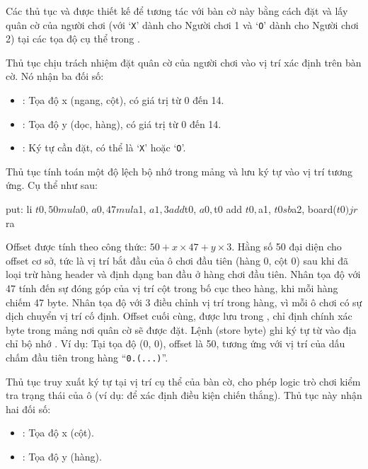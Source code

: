 Các thủ tục  và  được thiết kế để tương tác với bàn cờ này bằng cách đặt và lấy quân cờ của người chơi (với `\texttt{X}' dành cho Người chơi 1 và `\texttt{O}' dành cho Người chơi 2) tại các tọa độ cụ thể trong .

Thủ tục  chịu trách nhiệm đặt quân cờ của người chơi vào vị trí xác định trên bàn cờ. Nó nhận ba đối số:
\begin{itemize}
    \item {}: Tọa độ x (ngang, cột), có giá trị từ 0 đến 14.
    \item {}: Tọa độ y (dọc, hàng), có giá trị từ 0 đến 14.
    \item {}: Ký tự cần đặt, có thể là `\texttt{X}' hoặc `\texttt{O}'.
\end{itemize}

Thủ tục  tính toán một độ lệch bộ nhớ trong mảng  và lưu ký tự vào vị trí tương ứng. Cụ thể như sau:
\begin{code}
put:
    li $t0, 50
    mul $a0, $a0, 47
    mul $a1, $a1, 3
    add $t0, $a0, $t0
    add $t0, $a1, $t0
    sb $a2, board($t0)

    jr $ra
\end{code}

Offset được tính theo công thức: \( 50 + x \times 47 + y \times 3 \). Hằng số 50 đại diện cho offset cơ sở, tức là vị trí bắt đầu của ô chơi đầu tiên (hàng 0, cột 0) sau khi đã loại trừ hàng header và định dạng ban đầu ở hàng chơi đầu tiên. Nhân tọa độ  với 47 tính đến sự đóng góp của vị trí cột trong bố cục theo hàng, khi mỗi hàng chiếm 47 byte. Nhân tọa độ  với 3 điều chỉnh vị trí trong hàng, vì mỗi ô chơi có sự dịch chuyển vị trí cố định. Offset cuối cùng, được lưu trong , chỉ định chính xác byte trong mảng  nơi quân cờ sẽ được đặt. Lệnh  (store byte) ghi ký tự từ  vào địa chỉ bộ nhớ . Ví dụ: Tại tọa độ (0, 0), offset là 50, tương ứng với vị trí của dấu chấm đầu tiên trong hàng ``\texttt{0\vs\vs .\vs\vs (...)}''.

Thủ tục  truy xuất ký tự tại vị trí cụ thể của bàn cờ, cho phép logic trò chơi kiểm tra trạng thái của ô (ví dụ: để xác định điều kiện chiến thắng). Thủ tục này nhận hai đối số:
\begin{itemize}
    \item {}: Tọa độ x (cột).
    \item {}: Tọa độ y (hàng).
\end{itemize}

